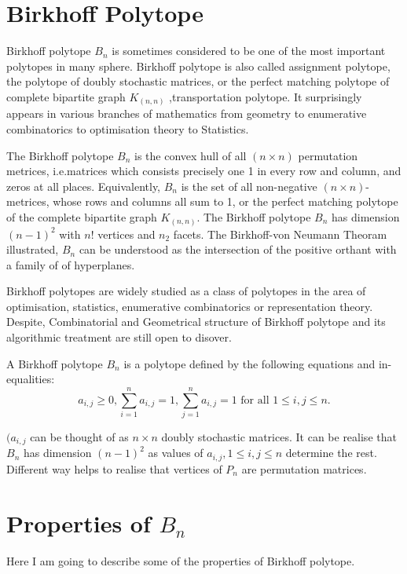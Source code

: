 \section{Birkhoff Polytope}

Birkhoff polytope $B_n$ is sometimes considered to be one of the most important polytopes in many sphere. Birkhoff polytope is also called assignment polytope, the polytope of doubly stochastic matrices, or the perfect matching polytope of complete bipartite graph $K_(n,n)$ ,transportation polytope. It surprisingly appears in various branches of mathematics from geometry to enumerative combinatorics to optimisation theory to Statistics.

The Birkhoff polytope $B_n$ is the convex hull of all $(n\times n)$ permutation metrices, i.e.matrices which consists precisely one 1 in every row and column, and zeros at all places. Equivalently, $B_n$ is the set of all non-negative $(n \times n)$-metrices, whose rows and columns all sum to 1, or the perfect matching polytope of the complete bipartite graph $K_(n,n)$. The Birkhoff polytope $B_n$ has dimension $(n-1)^2$ with $n!$ vertices and $n_2$ facets. The Birkhoff-von Neumann Theoram illustrated, $B_n$ can be understood as the intersection of the positive orthant with a family of of hyperplanes.

Birkhoff polytopes are widely studied as a class of polytopes in the area of optimisation, statistics, enumerative combinatorics or representation theory. Despite, Combinatorial and Geometrical structure of Birkhoff polytope and its algorithmic treatment are still open to disover.

A Birkhoff polytope $B_n$ is a polytope defined by the following equations and in-equalities:
\begin{equation}
a_{i,j} \geqslant 0, \sum_{i=1}^{n} a_{i,j} = 1, \sum_{j=1}^{n} a_{i,j}=1 \text{ for all } 1\leqslant i,j\leqslant n.
\label{eqn:Birkhoff_definition}
\end{equation}	

$(a_{i,j}$ can be thought of as  $n\times n$ doubly stochastic matrices. It can be realise that $B_n$ has dimension $(n-1)^2$ as values of $a_{i,j},1\leqslant i,j\leqslant n$ determine the rest. Different way helps to realise that vertices of $P_n$ are permutation matrices.

\section{Properties of $B_n$}
Here I am going to describe some of the properties of Birkhoff polytope.
